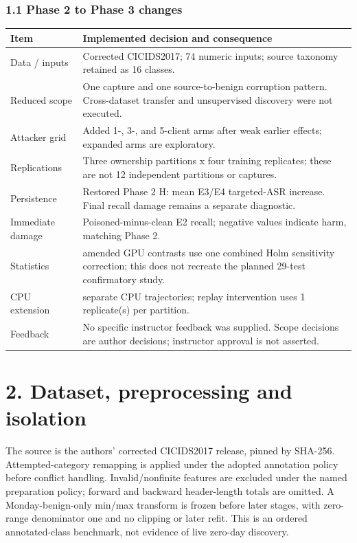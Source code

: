 \documentclass[
  10pt,
]{article}
\begin{document}
\hypertarget{phase-2-to-phase-3-changes}{%
\subsubsection{1.1 Phase 2 to Phase 3
changes}\label{phase-2-to-phase-3-changes}}

\begin{longtable}[]{@{}
  >{\raggedright\arraybackslash}p{}
  >{\raggedright\arraybackslash}p{}@{}}
\toprule
Item & Implemented decision and consequence \\
\midrule
\endhead
Data / inputs & Corrected CICIDS2017; 74 numeric inputs; source taxonomy
retained as 16 classes. \\
Reduced scope & One capture and one source-to-benign corruption pattern.
Cross-dataset transfer and unsupervised discovery were not executed. \\
Attacker grid & Added 1-, 3-, and 5-client arms after weak earlier
effects; expanded arms are exploratory. \\
Replications & Three ownership partitions x four training replicates;
these are not 12 independent partitions or captures. \\
Persistence & Restored Phase 2 H: mean E3/E4 targeted-ASR increase.
Final recall damage remains a separate diagnostic. \\
Immediate damage & Poisoned-minus-clean E2 recall; negative values
indicate harm, matching Phase 2. \\
Statistics & 47 amended GPU contrasts use one combined Holm sensitivity
correction; this does not recreate the planned 29-test confirmatory
study. \\
CPU extension & 12 separate CPU trajectories; replay intervention uses 1
replicate(s) per partition. \\
Feedback & No specific instructor feedback was supplied. Scope decisions
are author decisions; instructor approval is not asserted. \\
\bottomrule
\end{longtable}

\hypertarget{dataset-preprocessing-and-isolation}{%
\section{2. Dataset, preprocessing and
isolation}\label{dataset-preprocessing-and-isolation}}

The source is the authors' corrected CICIDS2017 release, pinned by
SHA-256. Attempted-category remapping is applied under the adopted
annotation policy before conflict handling. Invalid/nonfinite features
are excluded under the named preparation policy; forward and backward
header-length totals are omitted. A Monday-benign-only min/max transform
is frozen before later stages, with zero-range denominator one and no
clipping or later refit. This is an ordered annotated-class benchmark,
not evidence of live zero-day discovery.
\end{document}

